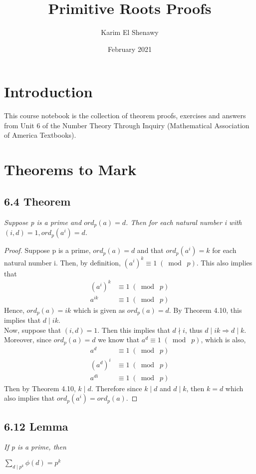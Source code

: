 \documentclass{article}
\title{Primitive Roots Proofs}
\author{Karim El Shenawy}
\date{February 2021}
\begin{document}
\maketitle

\section*{Introduction}
This course notebook is the collection of theorem proofs, exercises and answers from Unit 6 of the Number Theory Through Inquiry (Mathematical Association of America Textbooks).

\section*{Theorems to Mark}

\subsection*{6.4 Theorem} 
\quad \textit{Suppose p is a prime and $ord_p(a) = d$. Then for each natural number i with $(i, d) = 1, ord_p(a^i) = d$.}

\begin{proof}
Suppose p is a prime, $ord_p(a) = d$ and that $ord_p(a^i) = k$ for each natural number i. Then, by definition, $(a^i)^k \equiv 1 \;(\bmod\; p)$. This also implies that
\begin{align*}
    && (a^i)^k &\equiv 1 \;(\bmod\; p)&&\\
    && a^{ik} &\equiv 1 \;(\bmod\; p)&&
\end{align*}
Hence, $ord_p(a) = ik$ which is given as $ord_p(a) = d$. By Theorem 4.10, this implies that $d \mid ik$.\\
Now, suppose that $(i, d) = 1$. Then this implies that $d \nmid i$, thus $d \mid ik \Longrightarrow d \mid k$.\\
Moreover, since $ord_p(a) = d$ we know that $a^d \equiv 1 \;(\bmod\; p)$, which is also,
\begin{align*}
    && a^d &\equiv 1 \;(\bmod\; p)&&\\
    && (a^d)^i &\equiv 1 \;(\bmod\; p)&&\\
    && a^{di} &\equiv 1 \;(\bmod\; p)&&
\end{align*}
Then by Theorem 4.10, $k\mid d$. Therefore since $k\mid d$ and $d\mid k$, then $k = d$ which also implies that $ord_p(a^i) = ord_p(a)$.
\end{proof}

\subsection*{6.12 Lemma} 
\quad \textit{If p is a prime, then}
\begin{center}
    $\sum_{d \mid p^k} \phi(d) = p^k$
\end{center}
\end{document}
